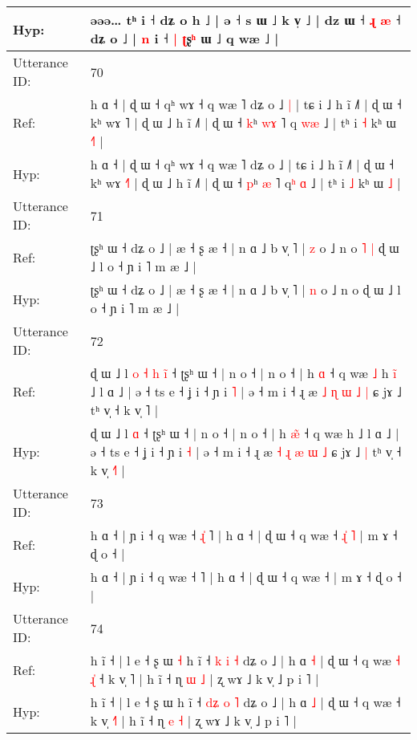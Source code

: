 \documentclass[10pt]{article}
\DeclareRobustCommand{\hl}[1]{{\textcolor{red}{#1}}}
\begin{document}
\begin{longtable}{ll}
 \\
Hyp: & əəə… tʰ i ˧ dʑ o\hl{}\hl{} h\hl{}\hl{}\hl{} ˩ | ə ˧ s ɯ ˩ k v̩ ˩ | dz ɯ ˧ \hl{ɻ} \hl{}\hl{æ} ˧ dʑ o ˩ | \hl{n} i ˧\hl{ }\hl{|} \hl{ʈ}ʂ\hl{ʰ} ɯ ˩ q wæ ˩ |
 \\
\midrule
Utterance ID: & 70 \\
Ref: & h ɑ ˧ | ɖ ɯ ˧ qʰ wɤ ˧ q wæ ˥ dʑ o ˩\hl{ }\hl{|} | tɕ i ˩ h ĩ ˩˥ | ɖ ɯ ˧ kʰ wɤ \hl{}˥ | ɖ ɯ ˩ h ĩ ˩˥ | ɖ ɯ ˧ \hl{k}ʰ \hl{w}\hl{ɤ} ˥ q\hl{ }\hl{w}\hl{æ} ˩ | tʰ i \hl{˧} kʰ ɯ \hl{˧}\hl{˥} |
 \\
Hyp: & h ɑ ˧ | ɖ ɯ ˧ qʰ wɤ ˧ q wæ ˥ dʑ o ˩\hl{}\hl{} | tɕ i ˩ h ĩ ˩˥ | ɖ ɯ ˧ kʰ wɤ \hl{˧}˥ | ɖ ɯ ˩ h ĩ ˩˥ | ɖ ɯ ˧ \hl{p}ʰ \hl{}\hl{æ} ˥ q\hl{ʰ}\hl{ }\hl{ɑ} ˩ | tʰ i \hl{˩} kʰ ɯ \hl{}\hl{˩} |
 \\
\midrule
Utterance ID: & 71 \\
Ref: & ʈʂʰ ɯ ˧ dʑ o ˩ | æ ˧ ʂ æ ˧ | n ɑ ˩ b v̩ ˥ | \hl{z} o ˩ n o\hl{ }\hl{˥}\hl{ }\hl{|} ɖ ɯ ˩ l o ˧ ɲ i ˥ m æ ˩ |
 \\
Hyp: & ʈʂʰ ɯ ˧ dʑ o ˩ | æ ˧ ʂ æ ˧ | n ɑ ˩ b v̩ ˥ | \hl{n} o ˩ n o\hl{}\hl{}\hl{}\hl{} ɖ ɯ ˩ l o ˧ ɲ i ˥ m æ ˩ |
 \\
\midrule
Utterance ID: & 72 \\
Ref: & ɖ ɯ ˩ l\hl{ }\hl{o}\hl{ }\hl{˧}\hl{ }\hl{h} \hl{i}\hl{̃} ˧ ʈʂʰ ɯ ˧ | n o ˧ | n o ˧ | h \hl{}\hl{ɑ} ˧ q wæ\hl{ }\hl{˩} h\hl{ }\hl{i}\hl{̃} ˩ l ɑ ˩ | ə ˧ ts e ˧ ʝ i ˧ ɲ i \hl{˥} | ə ˧ m i ˧ ɻ æ \hl{˩} \hl{ɳ} \hl{ɯ} \hl{˩} \hl{|} ɕ jɤ ˩\hl{}\hl{} tʰ v̩ ˧ k v̩ \hl{}˥ |
 \\
Hyp: & ɖ ɯ ˩ l\hl{}\hl{}\hl{}\hl{}\hl{}\hl{} \hl{}\hl{ɑ} ˧ ʈʂʰ ɯ ˧ | n o ˧ | n o ˧ | h \hl{æ}\hl{̃} ˧ q wæ\hl{}\hl{} h\hl{}\hl{}\hl{} ˩ l ɑ ˩ | ə ˧ ts e ˧ ʝ i ˧ ɲ i \hl{˧} | ə ˧ m i ˧ ɻ æ \hl{˧} \hl{ɻ} \hl{æ} \hl{ɯ} \hl{˩} ɕ jɤ ˩\hl{ }\hl{|} tʰ v̩ ˧ k v̩ \hl{˧}˥ |
 \\
\midrule
Utterance ID: & 73 \\
Ref: & h ɑ ˧ | ɲ i ˧ q wæ ˧\hl{ }\hl{ɻ}\hl{̍} ˥ | h ɑ ˧ | ɖ ɯ ˧ q wæ ˧\hl{ }\hl{ɻ}\hl{̍}\hl{ }\hl{˥} | m ɤ ˧ ɖ o ˧ |
 \\
Hyp: & h ɑ ˧ | ɲ i ˧ q wæ ˧\hl{}\hl{}\hl{} ˥ | h ɑ ˧ | ɖ ɯ ˧ q wæ ˧\hl{}\hl{}\hl{}\hl{}\hl{} | m ɤ ˧ ɖ o ˧ |
 \\
\midrule
Utterance ID: & 74 \\
Ref: & h ĩ ˧ | l e ˧ ʂ ɯ\hl{ }\hl{˧} h ĩ ˧ \hl{}\hl{k} \hl{i} \hl{˧} dʑ o ˩ | h ɑ \hl{˧} | ɖ ɯ ˧ q wæ\hl{ }\hl{˧}\hl{ }\hl{ɻ}\hl{̍} ˧ k v̩ \hl{}˥ | h ĩ ˧ ɳ \hl{ɯ} \hl{˩} | ʐ wɤ ˩ k v̩ ˩ p i ˥ |
 \\
Hyp: & h ĩ ˧ | l e ˧ ʂ ɯ\hl{}\hl{} h ĩ ˧ \hl{d}\hl{ʑ} \hl{o} \hl{˥} dʑ o ˩ | h ɑ \hl{˩} | ɖ ɯ ˧ q wæ\hl{}\hl{}\hl{}\hl{}\hl{} ˧ k v̩ \hl{˧}˥ | h ĩ ˧ ɳ \hl{e} \hl{˧} | ʐ wɤ ˩ k v̩ ˩ p i ˥ |

\end{longtable}
\end{document}
